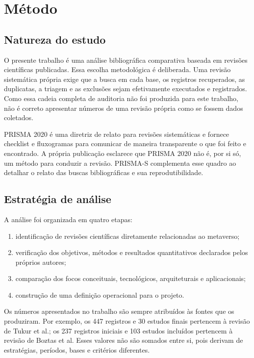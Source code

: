 \chapter{Método}
\label{cha:metodo}

\section{Natureza do estudo}

O presente trabalho é uma análise bibliográfica comparativa baseada em revisões científicas publicadas. Essa escolha metodológica é deliberada. Uma revisão sistemática própria exige que a busca em cada base, os registros recuperados, as duplicatas, a triagem e as exclusões sejam efetivamente executados e registrados. Como essa cadeia completa de auditoria não foi produzida para este trabalho, não é correto apresentar números de uma revisão própria como se fossem dados coletados.

PRISMA 2020 é uma diretriz de relato para revisões sistemáticas e fornece checklist e fluxogramas para comunicar de maneira transparente o que foi feito e encontrado. A própria publicação esclarece que PRISMA 2020 não é, por si só, um método para conduzir a revisão. PRISMA-S complementa esse quadro ao detalhar o relato das buscas bibliográficas e sua reprodutibilidade. \cite{page2021,rethlefsen2021}

\section{Estratégia de análise}

A análise foi organizada em quatro etapas:

\begin{enumerate}
    \item identificação de revisões científicas diretamente relacionadas ao metaverso;
    \item verificação dos objetivos, métodos e resultados quantitativos declarados pelos próprios autores;
    \item comparação dos focos conceituais, tecnológicos, arquiteturais e aplicacionais;
    \item construção de uma definição operacional para o projeto.
\end{enumerate}

Os números apresentados no trabalho são sempre atribuídos às fontes que os produziram. Por exemplo, os 447 registros e 30 estudos finais pertencem à revisão de Tukur et al.; os 237 registros iniciais e 103 estudos incluídos pertencem à revisão de Boztas et al. Esses valores não são somados entre si, pois derivam de estratégias, períodos, bases e critérios diferentes. \cite{tukur2024,boztas2025}

